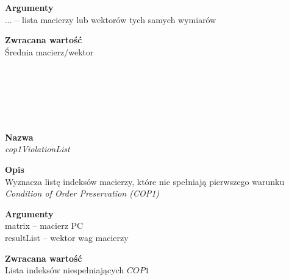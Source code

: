 \begin{spacing}{1.1}
\begin{spacing}{1.1}
\textbf{Argumenty} \\
... -- lista macierzy lub wektorów tych samych wymiarów\\ \begin{spacing}{0.3}  \end{spacing}

\textbf{Zwracana wartość}\\ Średnia macierz/wektor \\ \begin{spacing}{0.3}  \end{spacing}\\



\\~\\ 
\begin{spacing}{1.1}
 \\ \begin{spacing}{0.5}  \end{spacing}

\textbf{Nazwa}\\  \emph{cop1ViolationList} \\ \begin{spacing}{0.3}  \end{spacing}
 
\textbf{Opis}\\ Wyznacza listę indeksów macierzy, które nie spełniają pierwszego warunku \textit{Condition of Order Preservation (COP1)} \\  \begin{spacing}{0.3}  \end{spacing}
 
\textbf{Argumenty} \\
matrix -- macierz PC \\
resultList -- wektor wag macierzy \\  \begin{spacing}{0.3}  \end{spacing}

\textbf{Zwracana wartość}\\ Lista indeksów niespełniających $COP1$ \\ \begin{spacing}{0.3}  \end{spacing}\\


\newpage
\begin{spacing}{1.2}
 \\ \begin{spacing}{0.5}  \end{spacing}


\end{spacing}
\end{spacing}
\end{spacing}
\end{spacing}
